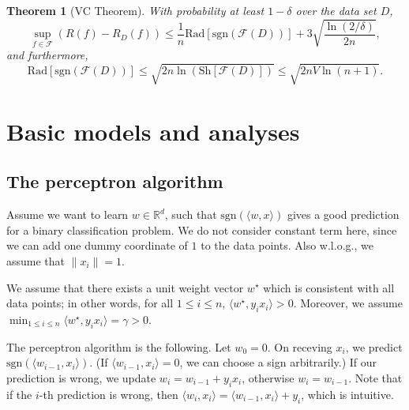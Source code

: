\documentclass[openany]{book}
\newtheorem{theorem}{Theorem}[chapter]
\theoremstyle{definition}
\theoremstyle{remark}
\begin{document}
\begin{theorem}[VC Theorem]
    With probability at least $1-\delta$ over the data set $D$,
    \begin{equation*}
        \sup_{f\in \mathcal{F}}\left(R(f)-R_{D}(f)\right)\le \frac{1}{n}\mathrm{Rad}[\mathrm{sgn}(\mathcal{F}(D))]+3\sqrt{\frac{\ln(2/\delta)}{2n}},
    \end{equation*}
    and furthermore,
    \begin{equation*}
        \mathrm{Rad}[\mathrm{sgn}(\mathcal{F}(D))]\le\sqrt{2n\ln\left(\mathrm{Sh}[\mathcal{F}(D)]\right)}\le\sqrt{2nV\ln(n+1)}.
    \end{equation*}
\end{theorem}

\part{Basic models and analyses}
\chapter{The perceptron algorithm}
Assume we want to learn $w\in \mathbb{R}^d$, such that $\mathrm{sgn}(\langle w,x\rangle)$ gives a good prediction for a binary classification problem. We do not consider constant term here, since we can add one dummy coordinate of $1$ to the data points. Also w.l.o.g., we assume that $\|x_i\|=1$.

We assume that there exists a unit weight vector $w^{\star}$ which is consistent with all data points; in other words, for all $1\le i\le n$, $\langle w^{\star},y_ix_i\rangle>0$. Moreover, we assume $\min_{1\le i\le n}\langle w^{\star},y_ix_i\rangle=\gamma>0$.

The perceptron algorithm is the following. Let $w_0=0$. On receving $x_i$, we predict $\mathrm{sgn}(\langle w_{i-1},x_i\rangle)$. (If $\langle w_{i-1},x_i\rangle=0$, we can choose a sign arbitrarily.) If our prediction is wrong, we update $w_i=w_{i-1}+y_ix_i$, otherwise $w_i=w_{i-1}$. Note that if the $i$-th prediction is wrong, then $\langle w_i,x_i\rangle=\langle w_{i-1},x_i\rangle+y_i$, which is intuitive.
\end{document}
